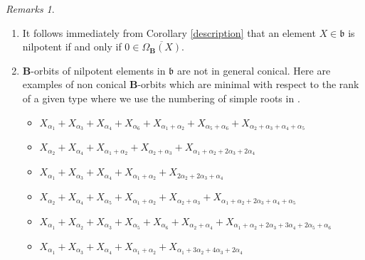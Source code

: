 \documentclass{amsart}
\theoremstyle{definition}
\theoremstyle{remark}
\newtheorem{remarks}[theorem]{Remarks}
\numberwithin{equation}{section}
\newcommand{\group}[1]{\mathbf{#1}}
\begin{document}
\begin{remarks}\label{conical}
\begin{enumerate}
\item It follows immediately from Corollary \ref{description} that an element
$X\in\mathfrak{b}$ is nilpotent if and only if $0 \in \overline{\Omega_{\group{B}} ( X)}$.
\item $\group{B}$-orbits of nilpotent elements in $\mathfrak{b}$ are not in general conical. 
Here are examples of non conical $\group{B}$-orbits which are minimal with respect to the 
rank of a given type where we use the numbering of simple roots in \cite{TY}. 
\begin{itemize}
\item[$A_{6}$ :] $X_{\alpha_{1}}+X_{\alpha_{3}}+X_{\alpha_{4}}+X_{\alpha_{6}}+
X_{\alpha_{1}+\alpha_{2}}+X_{\alpha_{5}+\alpha_{6}}+
X_{\alpha_{2}+\alpha_{3}+\alpha_{4}+\alpha_{5}}$
\item[$B_{4}$ :] $X_{\alpha_{2}}+X_{\alpha_{4}}+X_{\alpha_{1}+\alpha_{2}}+X_{\alpha_{2}+\alpha_{3}}
+X_{\alpha_{1}+\alpha_{2}+2\alpha_{3}+2\alpha_{4}}$
\item[$C_{4}$ :] $X_{\alpha_{1}}+X_{\alpha_{3}}+X_{\alpha_{4}}+X_{\alpha_{1}+\alpha_{2}}+
X_{2\alpha_{2}+2\alpha_{3}+\alpha_{4}}$
\item[$D_{5}$ :] $X_{\alpha_{2}}+X_{\alpha_{4}}+X_{\alpha_{5}}+X_{\alpha_{1}+\alpha_{2}}+
X_{\alpha_{2}+\alpha_{3}}+X_{\alpha_{1}+\alpha_{2}+2\alpha_{3}+\alpha_{4}+\alpha_{5}}$
\item[$E_{6}$ :] $X_{\alpha_{1}}+X_{\alpha_{2}}+X_{\alpha_{3}}+X_{\alpha_{5}}
+X_{\alpha_{6}} +X_{\alpha_{2}+\alpha_{4}}+ X_{\alpha_{1}
+\alpha_{2}+2\alpha_{3}+3\alpha_{4}+2\alpha_{5}+\alpha_{6}}$
\item[$F_{4}$ :] $X_{\alpha_{1}}+X_{\alpha_{3}}+X_{\alpha_{4}}+X_{\alpha_{1}+\alpha_{2}}
+X_{\alpha_{1}+3\alpha_{2}+4\alpha_{3}+2\alpha_{4}}$
\end{itemize}
\end{enumerate}
\end{remarks}

\end{document}
